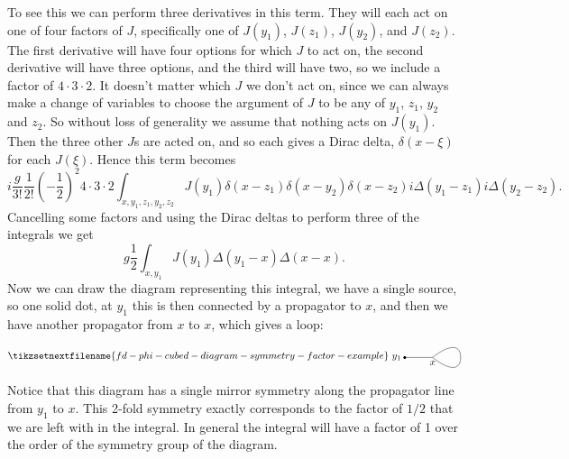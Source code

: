\documentclass[fleqn]{NotesClass}
\begin{document}
    To see this we can perform three derivatives in this term.
    They will each act on one of four factors of \(J\), specifically one of \(J(y_1)\), \(J(z_1)\), \(J(y_2)\), and \(J(z_2)\).
    The first derivative will have four options for which \(J\) to act on, the second derivative will have three options, and the third will have two, so we include a factor of \(4 \cdot 3 \cdot 2\).
    It doesn't matter which \(J\) we don't act on, since we can always make a change of variables to choose the argument of \(J\) to be any of \(y_1\), \(z_1\), \(y_2\) and \(z_2\).
    So without loss of generality we assume that nothing acts on \(J(y_1)\).
    Then the three other \(J\)s are acted on, and so each gives a Dirac delta, \(\delta(x - \xi)\) for each \(J(\xi)\).
    Hence this term becomes
    \begin{equation}
        i\frac{g}{3!} \frac{1}{2!} \left( -\frac{1}{2} \right)^2 4 \cdot 3 \cdot 2 \int_{x,y_1,z_1,y_2,z_2} J(y_1) \delta(x - z_1) \delta(x - y_2) \delta(x - z_2) i\Delta(y_1 - z_1) i\Delta(y_2 - z_2).
    \end{equation}
    Cancelling some factors and using the Dirac deltas to perform three of the integrals we get
    \begin{equation}
        g\frac{1}{2} \int_{x, y_1} J(y_1) \Delta(y_1 - x) \Delta(x - x).
    \end{equation}
    Now we can draw the diagram representing this integral, we have a single source, so one solid dot, at \(y_1\) this is then connected by a propagator to \(x\), and then we have another propagator from \(x\) to \(x\), which gives a loop:
    \begin{equation}
        \tikzsetnextfilename{fd-phi-cubed-diagram-symmetry-factor-example}
        \begin{tikzpicture}[baseline=(y.base)]
            \draw[looseness=1.5] (0, 0) node[left] (y) {\(y_1\)} -- (1, 0) to[out=40, in=90] (2, 0) to[out=270, in=-40] (1, 0) node [below] {\(x\)};
            \fill (0, 0) circle [radius = 0.05cm];
        \end{tikzpicture}
    \end{equation}
    Notice that this diagram has a single mirror symmetry along the propagator line from \(y_1\) to \(x\).
    This 2-fold symmetry exactly corresponds to the factor of \(1/2\) that we are left with in the integral.
    In general the integral will have a factor of 1 over the order of the symmetry group of the diagram.
    
\end{document}
